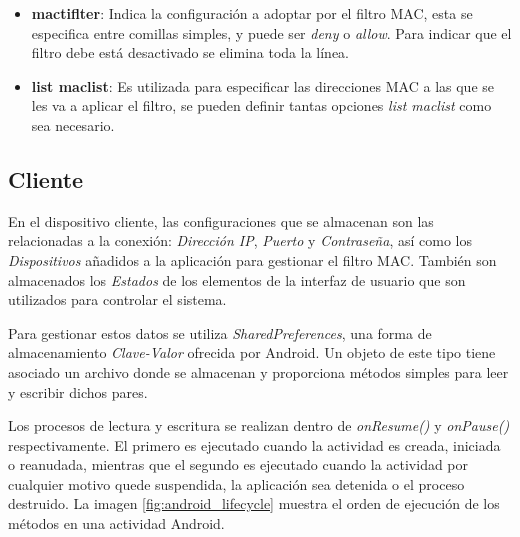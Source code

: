 \documentclass[12pt]{article}
\begin{document}
        \begin{itemize}
            \item \textbf{mactiflter}: Indica la configuración a adoptar por el filtro MAC, esta se especifica entre comillas simples, y puede ser \textit{deny} o \textit{allow}. Para indicar que el filtro debe está desactivado se elimina toda la línea.
            \item \textbf{list maclist}: Es utilizada para especificar las direcciones MAC a las que se les va a aplicar el filtro, se pueden definir tantas opciones \textit{list maclist} como sea necesario.
        \end{itemize}

    \subsection{Cliente}
        En el dispositivo cliente, las configuraciones que se almacenan son las relacionadas a la conexión: \textit{Dirección IP}, \textit{Puerto} y \textit{Contraseña}, así como los \textit{Dispositivos} añadidos a la aplicación para gestionar el filtro MAC. También son almacenados los \textit{Estados} de los elementos de la interfaz de usuario que son utilizados para controlar el sistema.

        Para gestionar estos datos se utiliza \textit{SharedPreferences}, una forma de almacenamiento \textit{Clave-Valor} ofrecida por Android. Un objeto de este tipo tiene asociado un archivo donde se almacenan y proporciona métodos simples para leer y escribir dichos pares.
        
        Los procesos de lectura y escritura se realizan dentro de \textit{onResume()} y \textit{onPause()} respectivamente. El primero es ejecutado cuando la actividad es creada, iniciada o reanudada, mientras que el segundo es ejecutado cuando la actividad por cualquier motivo quede suspendida, la aplicación sea detenida o el proceso destruido. La imagen \ref{fig:android_lifecycle} muestra el orden de ejecución de los métodos en una actividad Android.
        
\end{document}
